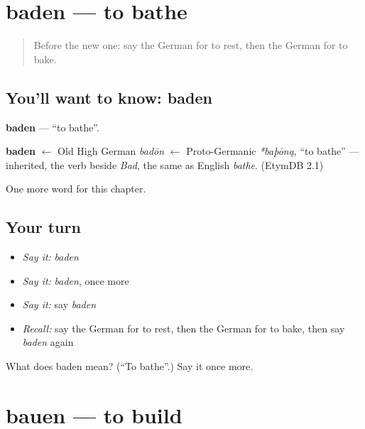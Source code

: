 \section[baden]{baden — to bathe}

\label{lesson:GE-C175-baden}



\begin{quote}
Before the new one: say the German for to rest, then the German for to bake.
\end{quote}

\subsection*{You'll want to know: baden}
\textbf{baden} — \textquotedblleft{}to bathe\textquotedblright{}.

\begin{cousinweb}
\textbf{baden} $\leftarrow$ Old High German \emph{badōn} $\leftarrow$ Proto-Germanic \emph{*baþōną}, \textquotedblleft{}to bathe\textquotedblright{} — inherited, the verb beside \emph{Bad}, the same as English \emph{bathe}. (EtymDB 2.1)
\end{cousinweb}

\begin{grammarlens}[title={What you've built}]
One more word for this chapter.
\end{grammarlens}

\subsection*{Your turn}
\begin{itemize}
\raggedright
  \item \emph{Say it:} \emph{baden}
  \item \emph{Say it:} \emph{baden}, once more
  \item \emph{Say it:} say \emph{baden}
  \item \emph{Recall:} say the German for to rest, then the German for to bake, then say \emph{baden} again
\end{itemize}

\begin{tcolorbox}[breakable,colback=teal!4,colframe=teal!35!black,title={Before you move on}]
What does baden mean? (\textquotedblleft{}To bathe\textquotedblright{}.) Say it once more.
\end{tcolorbox}
\section[bauen]{bauen — to build}


